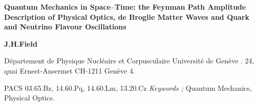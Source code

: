 \documentclass [12pt]{article}
\begin{document}
\begin{titlepage}
\begin{center}
\vspace*{2cm}
{\large \bf Quantum Mechanics in Space--Time: the Feynman Path Amplitude Description
  of Physical Optics, de Broglie Matter Waves and Quark and Neutrino Flavour Oscillations}
\vspace*{1.5cm}
\end{center}
\begin{center}
{\bf J.H.Field }
\end{center}
\begin{center}
{ 
D\'{e}partement de Physique Nucl\'{e}aire et Corpusculaire
 Universit\'{e} de Gen\`{e}ve . 24, quai Ernest-Ansermet
 CH-1211 Gen\`{e}ve 4.
}
\end{center}
\vspace*{2cm}
\begin{abstract}
  Feynman's laws of quantum dynamics are concisely stated, discussed in 
  comparison with other formulations of quantum mechanics and applied to selected 
  problems in the physical optics of photons and massive particles as well as
 flavour oscillations. The classical wave theory of light is derived from these laws
 for the case in which temporal variation of path amplitudes may be neglected, whereas specific
  experiments, sensitive to the temporal properties of path amplitudes, are suggested. 
  The reflection coefficient of light from the surface of a transparent medium is found
  to be markedly different to that predicted by the classical Fresnel formula. Except
  for neutrino oscillations, good agreement is otherwise found with previous calculations of
  spatially dependent quantum interference effects.             
\end{abstract}
\vspace*{1cm}
PACS 03.65.Bz, 14.60.Pq, 14.60.Lm, 13.20.Cz 
\newline
{\it Keywords ;} Quantum Mechanics,
Physical Optics.
\end{titlepage}
  
\end{document}
